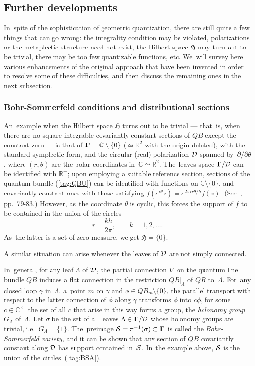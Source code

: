 \documentclass[11pt]{amsart}
\numberwithin{equation}{section}
\theoremstyle{remark}
\newcommand\Omg{{\bigam}}   %
\newcommand\DD{{\Cal D}}
\newcommand\MD{{\Omg/\DD}}
\newcommand\HH{\mathfrak H}
\newcommand\RR{\mathbb R}
\newcommand{\CC}{\C}
\newcommand{\bigam}{\mbox{\boldmath $\Gamma$}}
\newcommand{\C}{\mathbb C}
\begin{document}
\subsection{Further developments} \label{sec26}
In~spite of the sophistication of geometric quantization, there are still quite
a few things that can go wrong: the integrality condition may be violated,
polarizations or the metaplectic structure need not exist, the Hilbert space
$\HH$ may turn out to be trivial, there may be too few quantizable functions,
etc. We~will survey here various enhancements of the original approach that
have been invented in order to resolve some of these difficulties, and then
discuss the remaining ones in the next subsection.

\subsubsection{Bohr-Sommerfeld conditions and distributional sections}
\label{sec261}
An~example when the Hilbert space $\HH$ turns out to be trivial --- that~is,
when there are no square-integrable covariantly constant sections of $QB$
except the constant zero --- is that of $\Omg=\CC\setminus\{0\}$ ($\simeq
\RR^2$ with the origin deleted), with the standard symplectic form, and the
circular (real) polarization $\DD$ spanned by~$\partial/\partial\theta$, where
$(r,\theta)$ are the polar coordinates in~$\CC\simeq\RR^2$. The~leaves space
$\MD$ can be identified with $\RR^+$; upon employing a suitable reference
section, sections of the quantum bundle (\ref{tag:QBU}) can be identified with
functions on $\CC\setminus\{0\}$, and covariantly constant ones with those
satisfying $f(e^{i\theta}z)=e^{2\pi ir\theta/h} f(z)$. (See~\cite{bib:TuyCWI},
pp.~79-83.) However, as~the coordinate $\theta$ is cyclic, this forces the
support of $f$ to be contained in the union of the circles
\begin{equation}  r=\frac{kh}{2\pi}, \qquad k=1,2,\dots.  \label{tag:BSA}
\end{equation}
As~the latter is a set of zero measure, we get $\HH=\{0\}$.

A similar situation can arise whenever the leaves of $\DD$ are not simply
connected.

In~general, for any leaf $\Lambda$ of $\DD$, the partial connection $\nabla$ on
the quantum line bundle $QB$ induces a flat connection in the restriction
$QB|_\Lambda$ of $QB$ to~$\Lambda$. For~any closed loop $\gamma$ in~$\Lambda$,
a~point $m$ on $\gamma$ and $\phi\in QB_m\setminus\{0\}$, the parallel
transport with respect to the latter connection of $\phi$ along $\gamma$
transforms $\phi$ into $c\phi$, for some $c\in\CC^\times$; the set of all $c$
that arise in this way forms a group, the {\it holonomy group\/} $G_\Lambda$
of~$\Lambda$. Let $\sigma$ be the set of all leaves $\Lambda\in\MD$ whose
holonomy groups are trivial, i.e.~$G_\Lambda=\{1\}$. The~preimage $\Cal S=
\pi^{-1}(\sigma)\subset \Omg$ is called the {\sl Bohr-Sommerfeld variety,\/}
and it can be shown that any section of $QB$ covariantly constant along $\DD$
has support contained in~$\mathcal S$. In~the example above, $\mathcal S$ is the union
of the circles~(\ref{tag:BSA}).
\end{document}
